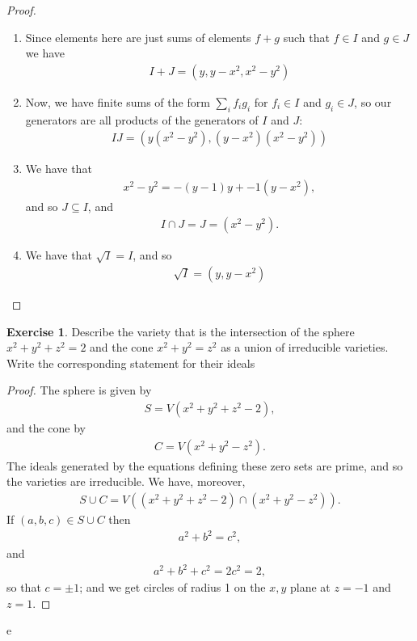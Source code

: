 \documentclass[12pt]{extarticle}
\newcommand{\<}{\langle}
\renewcommand{\>}{\rangle}
\theoremstyle{definition}
\newtheorem{exercise}{Exercise}
\begin{document}
\begin{proof}

  \begin{enumerate}
  \item
    Since elements here are just sums of elements $f + g$ such that $f \in I$ and $g \in J$ we have
    \begin{align}
      I + J = (y,y-x^2,x^2-y^2)
    \end{align}
  \item
    Now, we have finite sums of the form $\sum\limits_i f_i g_i$ for $f_i \in I$ and $g_i \in J$, so our generators are all products of the generators of $I$ and $J$:
    \begin{align}
      IJ = (y(x^2-y^2), (y-x^2)(x^2-y^2))
    \end{align}
    
  \item
    We have that
    \begin{align*}
      x^2 - y^2 = -(y-1)y + -1(y-x^2),
    \end{align*}
    and so $J \subseteq I$, and
    \begin{align*}
      I \cap J = J = (x^2-y^2).
    \end{align*}
  \item
    We have that $\sqrt{I} = I$, and so
    \begin{align*}
      \sqrt{I} = (y, y-x^2)
    \end{align*}
  \end{enumerate}
\end{proof}

\begin{exercise}
  Describe the variety that is the intersection of the sphere $x^2+y^2+z^2 = 2$ and the cone $x^2+y^2=z^2$ as a union of irreducible varieties. Write the corresponding statement for their ideals
\end{exercise}
\begin{proof}
  The sphere is given by
  \begin{align*}
    S = V(x^2+y^2+z^2 - 2),
  \end{align*}
  and the cone by
  \begin{align*}
    C = V(x^2+y^2-z^2).
  \end{align*}
  The ideals generated by the equations defining these zero sets are prime, and so the varieties are irreducible. We have, moreover, 
  \begin{align*}
    S \cup C = V((x^2+y^2+z^2-2) \cap (x^2+y^2 - z^2)).
  \end{align*}
  If $(a,b,c) \in S \cup C$ then
  \begin{align*}
    a^2 + b^2 = c^2,
  \end{align*}
  and
  \begin{align*}
    a^2 + b^2 + c^2 = 2c^2 = 2,
  \end{align*}
  so that $c = \pm 1$; and we get circles of radius 1 on the $x,y$ plane at $z=-1$ and $z=1$.
\end{proof}

e
\end{document}
